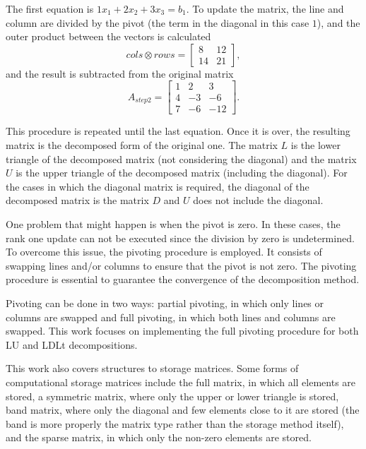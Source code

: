 The first equation is $1x_1 + 2x_2 + 3x_3 = b_1$. To update the matrix, the line and column are divided by the pivot (the term in the diagonal in this case $1$), and the outer product between the vectors is calculated
\begin{equation*}
    cols \otimes rows = 
    \begin{bmatrix}
        8 & 12 \\
        14 & 21
    \end{bmatrix},
\end{equation*}
and the result is subtracted from the original matrix
\begin{equation*}
    A_{step2} = 
    \begin{bmatrix}
        1 & 2 & 3 \\
        4 & -3 & -6 \\
        7 & -6 & -12
    \end{bmatrix}.
\end{equation*}

This procedure is repeated until the last equation. Once it is over, the resulting matrix is the decomposed form of the original one. The matrix $L$ is the lower triangle of the decomposed matrix (not considering the diagonal) and the matrix $U$ is the upper triangle of the decomposed matrix (including the diagonal). For the cases in which the diagonal matrix is required, the diagonal of the decomposed matrix is the matrix $D$ and $U$ does not include the diagonal.

One problem that might happen is when the pivot is zero. In these cases, the rank one update can not be executed since the division by zero is undetermined. To overcome this issue, the pivoting procedure is employed. It consists of swapping lines and/or columns to ensure that the pivot is not zero. The pivoting procedure is essential to guarantee the convergence of the decomposition method.

Pivoting can be done in two ways: partial pivoting, in which only lines or columns are swapped and full pivoting, in which both lines and columns are swapped. This work focuses on implementing the full pivoting procedure for both LU and LDLt decompositions.

This work also covers structures to storage matrices. Some forms of computational storage matrices include the full matrix, in which all elements are stored, a symmetric matrix, where only the upper or lower triangle is stored, band matrix, where only the diagonal and few elements close to it are stored (the band is more properly the matrix type rather than the storage method itself), and the sparse matrix, in which only the non-zero elements are stored. 

